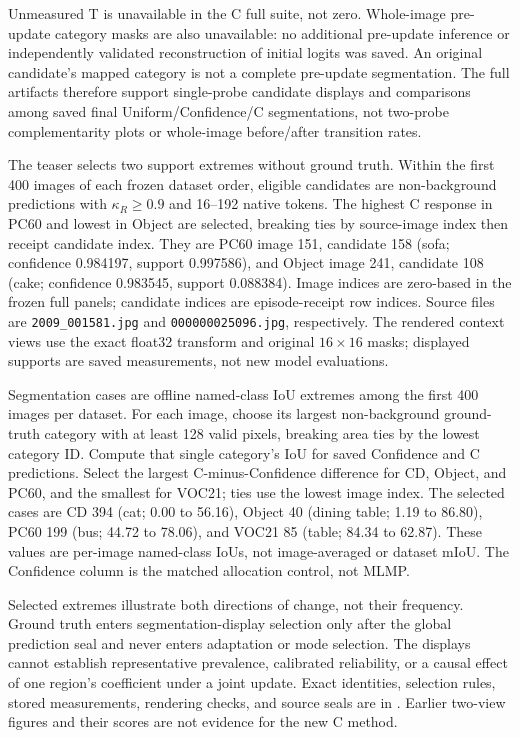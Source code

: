 Unmeasured T is unavailable in the C full suite, not zero. Whole-image pre-update category masks are also unavailable: no additional pre-update inference or independently validated reconstruction of initial logits was saved. An original candidate's mapped category is not a complete pre-update segmentation. The full artifacts therefore support single-probe candidate displays and comparisons among saved final Uniform/Confidence/C segmentations, not two-probe complementarity plots or whole-image before/after transition rates.

The teaser selects two support extremes without ground truth. Within the first 400 images of each frozen dataset order, eligible candidates are non-background predictions with $\kappa_R\geq0.9$ and 16--192 native tokens. The highest C response in PC60 and lowest in Object are selected, breaking ties by source-image index then receipt candidate index. They are PC60 image 151, candidate 158 (sofa; confidence 0.984197, support 0.997586), and Object image 241, candidate 108 (cake; confidence 0.983545, support 0.088384). Image indices are zero-based in the frozen full panels; candidate indices are episode-receipt row indices. Source files are \texttt{2009\_001581.jpg} and \texttt{000000025096.jpg}, respectively. The rendered context views use the exact float32 transform and original $16\times16$ masks; displayed supports are saved measurements, not new model evaluations.

Segmentation cases are offline named-class IoU extremes among the first 400 images per dataset. For each image, choose its largest non-background ground-truth category with at least 128 valid pixels, breaking area ties by the lowest category ID. Compute that single category's IoU for saved Confidence and C predictions. Select the largest C-minus-Confidence difference for CD, Object, and PC60, and the smallest for VOC21; ties use the lowest image index. The selected cases are CD 394 (cat; 0.00 to 56.16), Object 40 (dining table; 1.19 to 86.80), PC60 199 (bus; 44.72 to 78.06), and VOC21 85 (table; 84.34 to 62.87). These values are per-image named-class IoUs, not image-averaged or dataset mIoU. The Confidence column is the matched allocation control, not MLMP.

Selected extremes illustrate both directions of change, not their frequency. Ground truth enters segmentation-display selection only after the global prediction seal and never enters adaptation or mode selection. The displays cannot establish representative prevalence, calibrated reliability, or a causal effect of one region's coefficient under a joint update. Exact identities, selection rules, stored measurements, rendering checks, and source seals are in . Earlier two-view figures and their scores are not evidence for the new C method.

